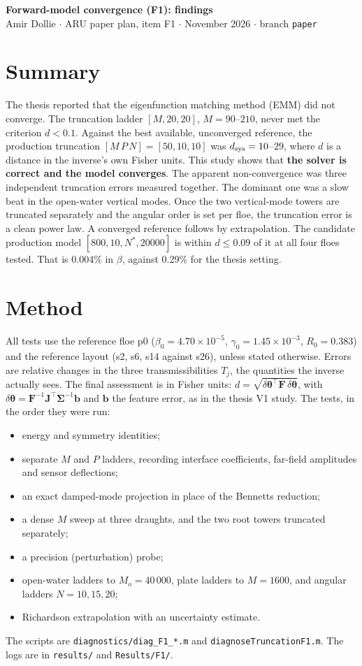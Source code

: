 \documentclass[10pt,a4paper]{article}
\begin{document}
{\large\bfseries\color{ocean} Forward-model convergence (F1): findings}\\[2pt]
{\small Amir Dollie \quad $\cdot$ \quad ARU paper plan, item F1 \quad $\cdot$  November 2026 \quad $\cdot$ \quad branch \texttt{paper}}

\section{Summary}
The thesis reported that the eigenfunction matching method (EMM) did not converge. The truncation ladder $[M,20,20]$, $M=90$--$210$, never met the criterion $d<0.1$. Against the best available, unconverged reference, the production truncation $[M\,P\,N]=[50,10,10]$ was $d_{\rm sys}=10$--$29$, where $d$ is a distance in the inverse's own Fisher units. This study shows that \textbf{the solver is correct and the model converges}. The apparent non-convergence was three independent truncation errors measured together. The dominant one was a slow beat in the open-water vertical modes. Once the two vertical-mode towers are truncated separately and the angular order is set per floe, the truncation error is a clean power law. A converged reference follows by extrapolation. The candidate production model $[800,10,N^*,20000]$ is within $d\le0.09$ of it at all four floes tested. That is 0.004\% in $\beta$, against 0.29\% for the thesis setting.

\section{Method}
All tests use the reference floe p0 ($\beta_0=4.70\times10^{-5}$, $\gamma_0=1.45\times10^{-3}$, $R_0=0.383$) and the reference layout (s2, s6, s14 against s26), unless stated otherwise. Errors are relative changes in the three transmissibilities $T_j$, the quantities the inverse actually sees. The final assessment is in Fisher units: $d=\sqrt{\delta\boldsymbol\theta^{\!\top}\mathbf F\,\delta\boldsymbol\theta}$, with $\delta\boldsymbol\theta=\mathbf F^{-1}\mathbf J^{\!\top}\boldsymbol\Sigma^{-1}\mathbf b$ and $\mathbf b$ the feature error, as in the thesis V1 study. The tests, in the order they were run:
\begin{itemize}
\item energy and symmetry identities;
\item separate $M$ and $P$ ladders, recording interface coefficients, far-field amplitudes and sensor deflections;
\item an exact damped-mode projection in place of the Bennetts reduction;
\item a dense $M$ sweep at three draughts, and the two root towers truncated separately;
\item a precision (perturbation) probe;
\item open-water ladders to $M_o=40\,000$, plate ladders to $M=1600$, and angular ladders $N=10,15,20$;
\item Richardson extrapolation with an uncertainty estimate.
\end{itemize}
The scripts are \texttt{diagnostics/diag\_F1\_*.m} and \texttt{diagnoseTruncationF1.m}. The logs are in \texttt{results/} and \texttt{Results/F1/}.
\end{document}
